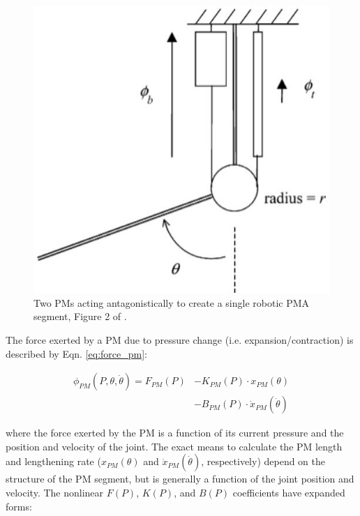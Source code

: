 \documentclass[conference]{IEEEtran}
\begin{document}
	\begin{figure}[htbp]
		\label{fig:pma_segment}
		\centerline{\includegraphics[width=\columnwidth]{images/pma.jpg}}
		\caption{Two \acp{PM} acting antagonistically to create a single robotic \ac{PMA} segment, Figure 2 of \cite{main-article}.}
	\end{figure}

	The force exerted by a \ac{PM} due to pressure change (i.e. expansion/contraction) is described by Eqn. \eqref{eq:force_pm}:

	\begin{equation}\label{eq:force_pm}
		\begin{aligned}
			\phi_{PM}(P, \theta, \dot{\theta}) = F_{PM}(P) &- K_{PM}(P) \cdot x_{PM}(\theta)\\
			&- B_{PM}(P) \cdot \dot{x}_{PM}(\dot{\theta})
		\end{aligned}
	\end{equation}

	where the force exerted by the \ac{PM} is a function of its current pressure and the position and velocity of the joint. The exact means to calculate the \ac{PM} length and lengthening rate ($x_{PM}(\theta)$ and $\dot{x}_{PM}(\dot{\theta})$, respectively) depend on the structure of the \ac{PM} segment, but is generally a function of the joint position and velocity. The nonlinear $F(P)$, $K(P)$, and $B(P)$ coefficients have expanded forms:
	
\end{document}
